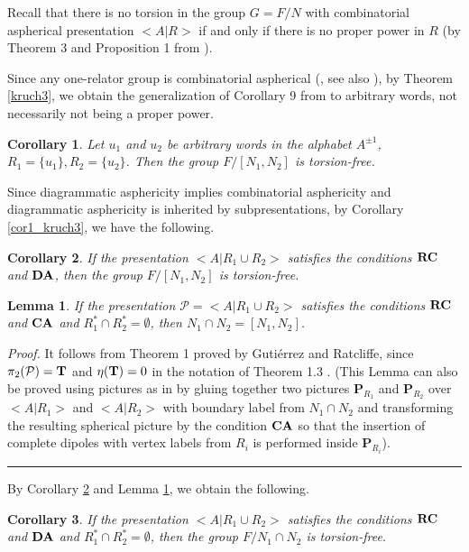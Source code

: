 \documentclass[12pt,reqno]{amsart}
\def\edvo{\rule {6pt}{6pt}}
\newtheorem{lem}{Lemma}
\newtheorem{cor}{Corollary}
\begin{document}
Recall that there is no torsion in the group $G=F/N$ with combinatorial aspherical presentation $<A|R>$ if and only if there is no proper power in $R$ (by Theorem 3 and Proposition 1 from \cite{huebschmann}).

Since any one-relator group is combinatorial aspherical (\cite{lind_pioneer}, see also \cite{lind,chiswell}), by Theorem \ref{kruch3}, we obtain the generalization of Corollary 9 from \cite{kuzmin2} to arbitrary words, not necessarily not being a proper power.

 \begin{cor}\label{cor2_kruch3}
 Let $u_1$ and $u_2$ be arbitrary words in the alphabet $A^{\pm 1}$, $R_1=\{u_1\}, R_2=\{u_2\}$.
 Then the group $F/[N_1,N_2]$ is torsion-free.
 \end{cor}

 Since diagrammatic asphericity implies combinatorial asphericity and diagrammatic asphericity is inherited by subpresentations, by Corollary \ref{cor1_kruch3}, we have the following.

  \begin{cor}\label{cor3_kruch4}
If the presentation $<A|R_1\cup R_2>$ satisfies the conditions $\bf RC$ and $\bf DA$, then the group $F/[N_1,N_2]$ is torsion-free.
 \end{cor}


\begin{lem}\label{lem_ratcliff}
If the presentation $\mathcal{P}=<A|R_1\cup R_2>$ satisfies the conditions $\bf RC$ and $\bf CA$ and $R_1^*\cap R_2^*=\emptyset$, then $N_1\cap N_2 =[ N_1, N_2]$.
 \end{lem}
{\it Proof.} It follows from Theorem 1 \cite{ratcl} proved by
Guti\'{e}rrez and Ratcliffe, since $\pi_2(\mathcal{P}) = {\bf T}$ and $\eta({\bf T}) = 0$ in the notation  of Theorem 1.3 \cite{pride}. (This Lemma can also be proved using pictures as in \cite{ok} by gluing together two pictures $\mathbf{P}_{R_1}$ and $\mathbf{P}_{R_2}$ over $<A|R_1>$ and $<A|R_2>$ with boundary label from $N_1\cap N_2$ and transforming the resulting spherical picture by the condition $\bf CA$ so that the insertion of complete dipoles with vertex labels from $R_i$ is performed inside $\mathbf{P}_{R_i}$).
\edvo


 By Corollary \ref{cor3_kruch4} and Lemma \ref{lem_ratcliff}, we obtain the following.

  \begin{cor}\label{cor3_kruch3}
If the presentation $<A|R_1\cup R_2>$ satisfies the conditions $\bf RC$ and $\bf DA$ and $R_1^*\cap R_2^*=\emptyset$, then the group $F/N_1\cap N_2$ is torsion-free.
 \end{cor}
\end{document}
